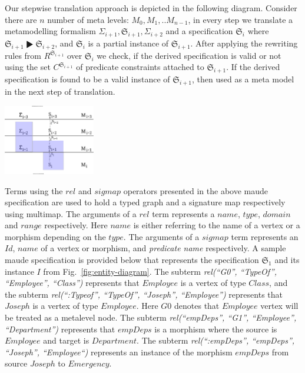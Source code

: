 \documentclass{eceasst}
\begin{document}
Our stepwise translation approach is depicted in the following diagram. Consider there are $n$  number of meta levels: $M_0, M_1, .. M_{n-1}$, in every step we translate a metamodelling formalism 
$\Sigma_{i+1}, \mathfrak{S}_{i+1}, \Sigma_{i+2}$ and a specification $\mathfrak{S}_i$ where $\mathfrak{S}_{i+1} \RHD \mathfrak{S}_{i+2}$, and 
$\mathfrak{S}_{i}$ is a partial instance of $\mathfrak{S}_{i+1}$. After applying the rewriting rules from $R^{\mathfrak{S}_{i+1}}$ over $\mathfrak{S}_{i}$ we check, if the derived specification 
is valid or not using the set $C^{\mathfrak{S}_{i+1}}$ of predicate constraints attached to $\mathfrak{S}_{i+1}$. 
If the derived specification is found to be a valid instance of $\mathfrak{S}_{i+1}$, then used as a meta model in the next step of translation. 

\begin{center}
\includegraphics[width=0.3\textwidth]{stepwise-dpf.pdf}
\end{center}

Terms using the $rel$ and $sigmap$ operators presented in the above maude specification are used to hold a typed graph and a signature map respectively using multimap. 
The arguments of a $rel$ term represents a $name$, $type$, $domain$ and $range$ respectively. 
Here $name$ is either referring to the name of a vertex or a morphism depending on the $type$. 
The arguments of a $sigmap$ term represents an $Id$, $name$ of a vertex or morphism, and \textit{predicate name} respectively. 
A sample maude specification is provided below that represents the specification $\mathfrak{S}_1$ and its instance $I$ from Fig.~\ref{fig:entity-diagram}. 
The subterm \textit{rel(``G0'', ``TypeOf'', ``Employee'', ``Class'')} represents that $Employee$ is a vertex of type $Class$, and 
the subterm \textit{rel(``:Typeof'', ``TypeOf'', ``Joseph'', ``Employee'')} represents that $Joseph$ is a vertex of type $Employee$.
Here $G0$ denotes that $Employee$ vertex will be treated as a metalevel node. 
The subterm \textit{rel(``empDeps'', ``G1'', ``Employee'', ``Department'')} represents that $empDeps$ is a morphism where the source is $Employee$ and target is $Department$. 
The subterm \textit{rel(``:empDeps'', ``empDeps'', ``Joseph'', ``Employee``)} represents an instance of the morphism $empDeps$ from source $Joseph$ to $Emergency$.
\end{document}
